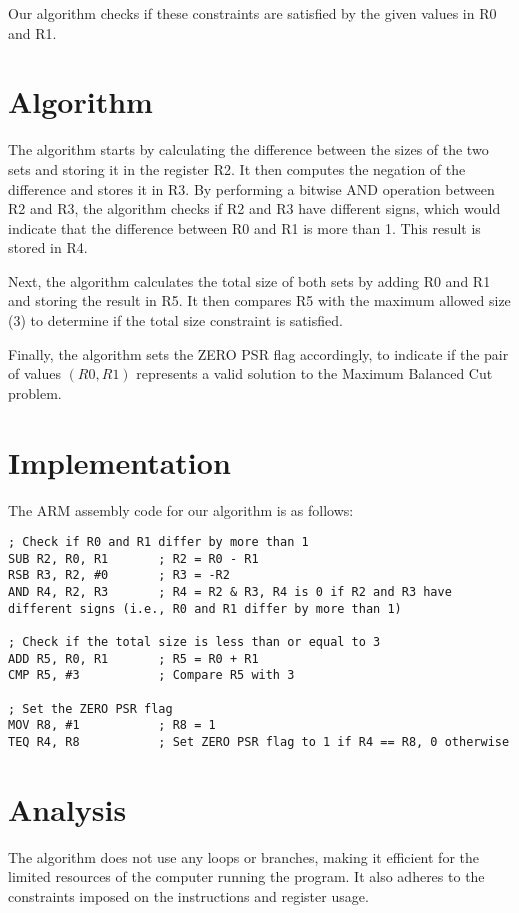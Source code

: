 Our algorithm checks if these constraints are satisfied by the given values in R0 and R1.

\section{Algorithm}

The algorithm starts by calculating the difference between the sizes of the two sets and storing it in the register R2. It then computes the negation of the difference and stores it in R3. By performing a bitwise AND operation between R2 and R3, the algorithm checks if R2 and R3 have different signs, which would indicate that the difference between R0 and R1 is more than 1. This result is stored in R4.

Next, the algorithm calculates the total size of both sets by adding R0 and R1 and storing the result in R5. It then compares R5 with the maximum allowed size (3) to determine if the total size constraint is satisfied.

Finally, the algorithm sets the ZERO PSR flag accordingly, to indicate if the pair of values $(R0, R1)$ represents a valid solution to the Maximum Balanced Cut problem.

\section{Implementation}

The ARM assembly code for our algorithm is as follows:

\begin{verbatim}
; Check if R0 and R1 differ by more than 1
SUB R2, R0, R1       ; R2 = R0 - R1
RSB R3, R2, #0       ; R3 = -R2
AND R4, R2, R3       ; R4 = R2 & R3, R4 is 0 if R2 and R3 have different signs (i.e., R0 and R1 differ by more than 1)

; Check if the total size is less than or equal to 3
ADD R5, R0, R1       ; R5 = R0 + R1
CMP R5, #3           ; Compare R5 with 3

; Set the ZERO PSR flag
MOV R8, #1           ; R8 = 1
TEQ R4, R8           ; Set ZERO PSR flag to 1 if R4 == R8, 0 otherwise
\end{verbatim}

\section{Analysis}

The algorithm does not use any loops or branches, making it efficient for the limited resources of the computer running the program. It also adheres to the constraints imposed on the instructions and register usage.


